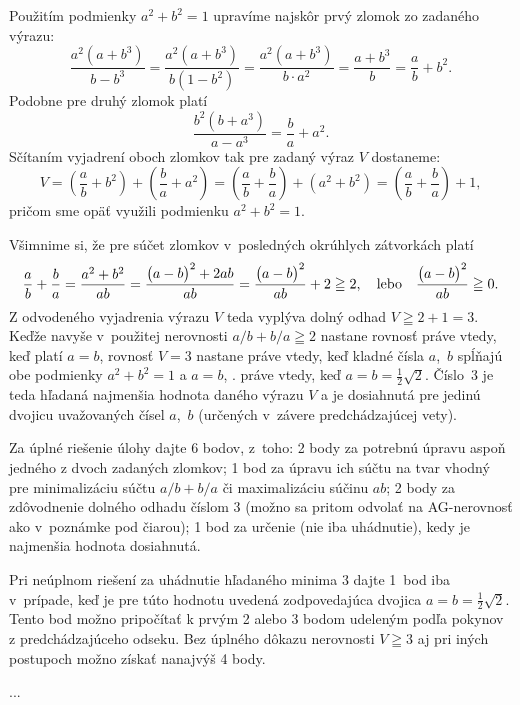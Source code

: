 {%
Použitím podmienky $a^2+b^2=1$ upravíme najskôr prvý zlomok zo
zadaného výrazu:
$$
\frac{a^2(a+b^3)}{b-b^3}=\frac{a^2(a+b^3)}{b(1-b^2)}=
\frac{a^2(a+b^3)}{b\cdot a^2}=\frac{a+b^3}{b}=\frac{a}{b}+b^2.
$$
Podobne pre druhý zlomok platí
$$
\frac{b^2(b+a^3)}{a-a^3}=\frac{b}{a}+a^2.
$$
Sčítaním vyjadrení oboch zlomkov tak pre zadaný výraz $V$ dostaneme:
$$
V=\left(\frac{a}{b}+b^2\right)+\left(\frac{b}{a}+a^2\right)=
\left(\frac{a}{b}+\frac{b}{a}\right)+(a^2+b^2)=
\left(\frac{a}{b}+\frac{b}{a}\right)+1,
$$
pričom sme opäť využili podmienku $a^2+b^2=1$.

Všimnime si, že pre súčet zlomkov v~posledných okrúhlych zátvorkách
platí
$$
\frac{a}{b}+\frac{b}{a}=\frac{a^2+b^2}{ab}=
\frac{\bigl(a-b\bigr)^2+2ab}{ab}=
\frac{\bigl(a-b\bigr)^2}{ab}+2\geqq2,\quad\hbox{lebo}\quad
\frac{\bigl(a-b\bigr)^2}{ab}\geqq0.
$$
Z odvodeného vyjadrenia výrazu $V$ teda vyplýva
dolný odhad $V\geqq2+1=3$. Keďže navyše v~použitej nerovnosti $a/b+b/a\geqq2$
nastane rovnosť práve vtedy, keď platí ${a=b}$, rovnosť $V=3$ nastane
práve vtedy, keď kladné čísla $a$,~$b$ spĺňajú obe podmienky ${a^2+b^2}=1$ a $a=b$,
\tj. práve vtedy, keď $a=b=\frac12\sqrt{2}$.
Číslo~3 je teda hľadaná najmenšia hodnota
daného výrazu $V$ a je dosiahnutá pre jedinú dvojicu uvažovaných
čísel $a$,~$b$ (určených v~závere predchádzajúcej vety).

\schemaABC
Za úplné riešenie úlohy dajte 6 bodov, z~toho: 2 body za potrebnú úpravu
aspoň jedného z dvoch zadaných zlomkov;
1 bod za úpravu ich súčtu
na tvar vhodný pre minimalizáciu
súčtu $a/b+b/a$ či maximalizáciu súčinu $ab$;
2 body za zdôvodnenie dolného odhadu číslom 3
(možno sa pritom odvolať na AG-nerovnosť ako v~poznámke pod čiarou);
1 bod za určenie (nie iba uhádnutie),
kedy je najmenšia hodnota dosiahnutá.

Pri neúplnom riešení za uhádnutie hľadaného minima 3 dajte 1~bod iba
v~prípade, keď je pre túto hodnotu uvedená zodpovedajúca dvojica
$a=b=\frac12\sqrt{2}$. Tento bod možno pripočítať k prvým 2 alebo 3
bodom udeleným podľa pokynov z predchádzajúceho odseku. Bez úplného dôkazu
nerovnosti $V\geqq3$ aj pri iných postupoch možno získať nanajvýš 4
body.
\endschema
}

{%
...}

